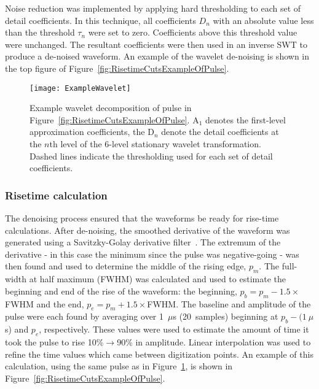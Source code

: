 Noise reduction was implemented by applying hard thresholding to each set of detail coefficients.  In this technique, all coefficients $D_{n}$ with an absolute value less than the threshold $\tau_{n}$ were set to zero.  Coefficients above this threshold value were unchanged.  The resultant coefficients were then used in an inverse SWT to produce a de-noised waveform.  An example of the wavelet de-noising is shown in the top figure of Figure~\ref{fig:RisetimeCutsExampleOfPulse}.
	
			
				\begin{figure}
					\centering
					\texttt{[image: ExampleWavelet]}
					\caption[Example wavelet decomposition of pulse]
					{Example wavelet decomposition of pulse in Figure~\ref{fig:RisetimeCutsExampleOfPulse}.  
					A$_{1}$ denotes the first-level
					 approximation coefficients, the D$_{n}$ denote the detail coefficients at the $n$th level of the 6-level stationary wavelet 
					 transformation.  Dashed lines indicate the thresholding used for each set of detail coefficients.}
					\label{fig:RisetimeCutsWaveletDecompositionOfPulse}
				\end{figure}					

			\subsubsection{Risetime calculation}
			\label{sec:RisetimeCalculation}
	The denoising process ensured that the waveforms be ready for rise-time calculations.  After de-noising, the smoothed derivative of the waveform was generated using a Savitzky-Golay derivative filter~\cite{Sav64aa}.  The extremum of the derivative - in this case the minimum since the pulse was negative-going - was then found and used to determine the middle of the rising edge, $p_{m}$.  The full-width at half maximum (FWHM) was calculated and used to estimate the beginning and end of the rise of the waveform: the beginning, $p_{b} = p_{m} - 1.5\times$FWHM and the end, $p_{e} = p_{m} + 1.5\times$FWHM.  The baseline and amplitude of the pulse were each found by averaging over 1~$\mu$s (20~samples) beginning at $p_{b} - (1~\mu$s) and $p_{e}$, respectively.  These values were used to estimate the amount of time it took the pulse to rise 10\%$\to$90\% in amplitude.  Linear interpolation was used to refine the time values which came between digitization points.  An example of this calculation, using the same pulse as in Figure~\ref{fig:RisetimeCutsWaveletDecompositionOfPulse}, is shown in Figure~\ref{fig:RisetimeCutsExampleOfPulse}.  
		
